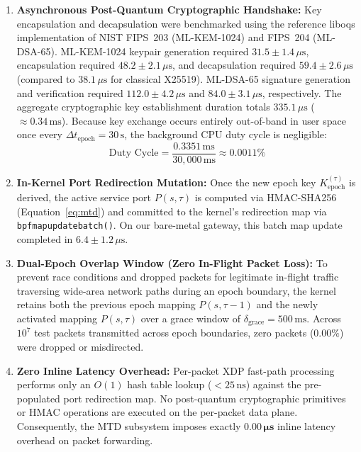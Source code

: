 \documentclass[journal]{IEEEtran}
\renewcommand{\_}{\textunderscore\allowbreak}
\begin{document}
\begin{enumerate}
  \item \textbf{Asynchronous Post-Quantum Cryptographic Handshake:} Key encapsulation and decapsulation were benchmarked using the reference liboqs implementation of NIST FIPS~203 (ML-KEM-1024) and FIPS~204 (ML-DSA-65). ML-KEM-1024 keypair generation required $31.5 \pm 1.4\,\mu\text{s}$, encapsulation required $48.2 \pm 2.1\,\mu\text{s}$, and decapsulation required $59.4 \pm 2.6\,\mu\text{s}$ (compared to $38.1\,\mu\text{s}$ for classical X25519). ML-DSA-65 signature generation and verification required $112.0 \pm 4.2\,\mu\text{s}$ and $84.0 \pm 3.1\,\mu\text{s}$, respectively. The aggregate cryptographic key establishment duration totals $335.1\,\mu\text{s}$ (${\approx}0.34\,\text{ms}$). Because key exchange occurs entirely out-of-band in user space once every $\Delta t_{\text{epoch}} = 30\,\text{s}$, the background CPU duty cycle is negligible:
  \begin{equation}
    \text{Duty Cycle} = \frac{0.3351\,\text{ms}}{30{,}000\,\text{ms}} \approx 0.0011\%
    \label{eq:mtd_duty_cycle}
  \end{equation}

  \item \textbf{In-Kernel Port Redirection Mutation:} Once the new epoch key $K_{\text{epoch}}^{(\tau)}$ is derived, the active service port $P(s, \tau)$ is computed via HMAC-SHA256 (Equation~\ref{eq:mtd}) and committed to the kernel's redirection map via \texttt{bpf\_map\_update\_batch()}. On our bare-metal gateway, this batch map update completed in $6.4 \pm 1.2\,\mu\text{s}$.

  \item \textbf{Dual-Epoch Overlap Window (Zero In-Flight Packet Loss):} To prevent race conditions and dropped packets for legitimate in-flight traffic traversing wide-area network paths during an epoch boundary, the kernel retains both the previous epoch mapping $P(s, \tau-1)$ and the newly activated mapping $P(s, \tau)$ over a grace window of $\delta_{\text{grace}} = 500\,\text{ms}$. Across $10^7$ test packets transmitted across epoch boundaries, zero packets ($0.00\%$) were dropped or misdirected.

  \item \textbf{Zero Inline Latency Overhead:} Per-packet XDP fast-path processing performs only an $O(1)$ hash table lookup ($< 25\,\text{ns}$) against the pre-populated port redirection map. No post-quantum cryptographic primitives or HMAC operations are executed on the per-packet data plane. Consequently, the MTD subsystem imposes exactly $\mathbf{0.00\,\mu\text{s}}$ inline latency overhead on packet forwarding.
\end{enumerate}
\end{document}
